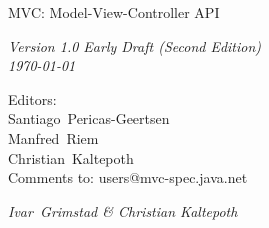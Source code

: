 \begin{titlepage}
\raggedleft

\vspace*{60pt}

{\Huge
\textsf{MVC: Model-View-Controller API}}

\vspace{20pt}

{
\Large\textit{Version 1.0 Early Draft (Second Edition)\\
\today}
}

\vspace{40pt}

{\large Editors:\\
Santiago\ Pericas-Geertsen\\
Manfred\ Riem\\
Christian\ Kaltepoth\\
\vspace{10pt}Comments to: users@mvc-spec.java.net
}

\vspace{80pt}

{\small\textit{Ivar\ Grimstad \& Christian Kaltepoth}
}
\end{titlepage} 
